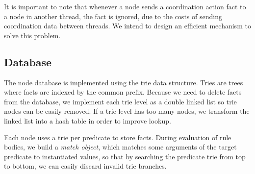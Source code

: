 It is important to note that whenever a node sends a coordination action fact to a node in another thread, the fact is ignored, due to the costs of sending
coordination data between threads. We intend to design an efficient mechanism to solve this problem.

\subsection{Database}

The node database is implemented using the trie data structure. Tries are trees where facts are indexed
by the common prefix. Because we need to delete facts from the database, we implement each trie level
as a double linked list so trie nodes can be easily removed. If a trie level has too many nodes, we
transform the linked list into a hash table in order to improve lookup.

Each node uses a trie per predicate to store facts. During evaluation of rule bodies, we build a
\emph{match object}, which matches some arguments of the target predicate to instantiated values, so
that by searching the predicate trie from top to bottom, we can easily discard invalid trie branches.
